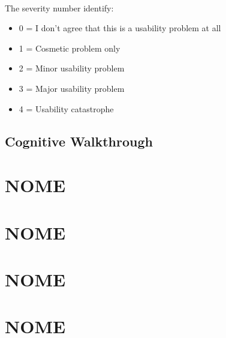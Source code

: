 \documentclass[12pt, a4paper]{article}
\begin{document}
  \mbox{}\\
  The severity number identify:
  \begin{itemize}
	\item 0 = I don’t agree that this is a usability problem at all
	\item 1 = Cosmetic problem only
	\item 2 = Minor usability problem
	\item 3 = Major usability problem
	\item 4 = Usability catastrophe
\end{itemize}

\subsection{Cognitive Walkthrough}


\newpage

\section{NOME}


\newpage

\section{NOME}


\newpage

\section{NOME}


\newpage

\section{NOME}
\end{document}
